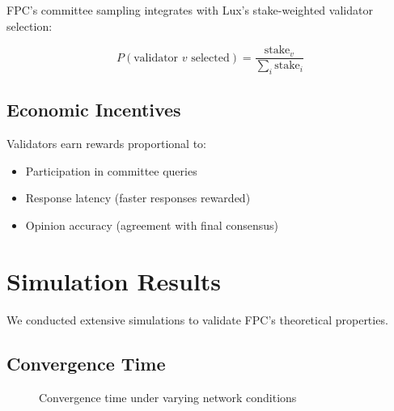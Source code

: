 \documentclass[11pt,a4paper]{article}
\begin{document}
FPC's committee sampling integrates with Lux's stake-weighted validator selection:

\begin{equation}
P(\text{validator } v \text{ selected}) = \frac{\text{stake}_v}{\sum_{i} \text{stake}_i}
\end{equation}

\subsection{Economic Incentives}

Validators earn rewards proportional to:
\begin{itemize}
\item Participation in committee queries
\item Response latency (faster responses rewarded)
\item Opinion accuracy (agreement with final consensus)
\end{itemize}

\section{Simulation Results}
\label{sec:simulation}

We conducted extensive simulations to validate FPC's theoretical properties.

\subsection{Convergence Time}

\begin{figure}[h]
\centering
{}
\caption{Convergence time under varying network conditions}
\label{fig:convergence}
\end{figure}
\end{document}

